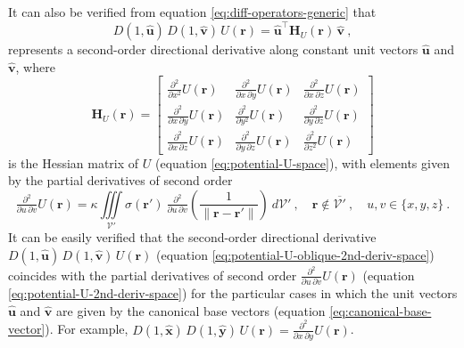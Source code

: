 \documentclass[manuscript,noblind]{geophysics}
\begin{document}
	It can also be verified from equation \ref{eq:diff-operators-generic} that 
	\begin{equation}
		D(1, \hat{\mathbf{u}}) \, D(1, \hat{\mathbf{v}}) \, U(\mathbf{r}) = 
		\hat{\mathbf{u}}^{\top} \mathbf{H}_{U}(\mathbf{r}) \, \hat{\mathbf{v}} \: ,
		\label{eq:potential-U-oblique-2nd-deriv-space}
	\end{equation}
	represents a second-order directional derivative along constant unit vectors $\hat{\mathbf{u}}$ and
	$\hat{\mathbf{v}}$, where 
	\begin{equation}
		\mathbf{H}_{U}(\mathbf{r}) = 
		\begin{bmatrix}
			\tfrac{\partial^{2}}{\partial x^{2}} U(\mathbf{r}) & 
			\tfrac{\partial^{2}}{\partial x \, \partial y} U(\mathbf{r}) & 
			\tfrac{\partial^{2}}{\partial x \, \partial z} U(\mathbf{r}) \\
			\tfrac{\partial^{2}}{\partial x \, \partial y} U(\mathbf{r}) & 
			\tfrac{\partial^{2}}{\partial y^{2}} U(\mathbf{r}) & 
			\tfrac{\partial^{2}}{\partial y \, \partial z} U(\mathbf{r}) \\
			\tfrac{\partial^{2}}{\partial x \, \partial z} U(\mathbf{r}) & 
			\tfrac{\partial^{2}}{\partial y \, \partial z} U(\mathbf{r}) & 
			\tfrac{\partial^{2}}{\partial z^{2}} U(\mathbf{r})
		\end{bmatrix}
		\label{eq:potential-U-Hessian}
	\end{equation}
	is the Hessian matrix \citep[e.g.,][ p. 158]{kaplan2002} of $U$ (equation \ref{eq:potential-U-space}),
	with elements given by the partial derivatives of second order
	\begin{equation}
		\tfrac{\partial^{2}}{\partial u \, \partial v} U(\mathbf{r}) = \kappa \iiint\limits_{\mathcal{V}'}
		\sigma(\mathbf{r}') \: 
		\tfrac{\partial^{2}}{\partial u \, \partial v} \left( \frac{1}{\| \mathbf{r} - \mathbf{r}'\|} \right)
		\: d\mathcal{V}' \: , \quad \mathbf{r} \notin \overline{\mathcal{V}'} \: , \quad u, v \in \{ x, y, z \} \: .
		\label{eq:potential-U-2nd-deriv-space}
	\end{equation} 
	It can be easily verified that 
	the second-order directional derivative $D(1, \hat{\mathbf{u}}) \, D(1, \hat{\mathbf{v}}) \, U(\mathbf{r})$ 
	(equation \ref{eq:potential-U-oblique-2nd-deriv-space})
	coincides with the partial derivatives of second order $\tfrac{\partial^{2}}{\partial u \, \partial v} U(\mathbf{r})$ 
	(equation \ref{eq:potential-U-2nd-deriv-space}) for the particular cases in which the unit vectors 
	$\hat{\mathbf{u}}$ and $\hat{\mathbf{v}}$ are given by the canonical base vectors (equation \ref{eq:canonical-base-vector}).
	For example, $D(1, \hat{\mathbf{x}}) \, D(1, \hat{\mathbf{y}}) \, U(\mathbf{r}) = \tfrac{\partial^{2}}{\partial x \, \partial y} U(\mathbf{r})$.
	
\end{document}
